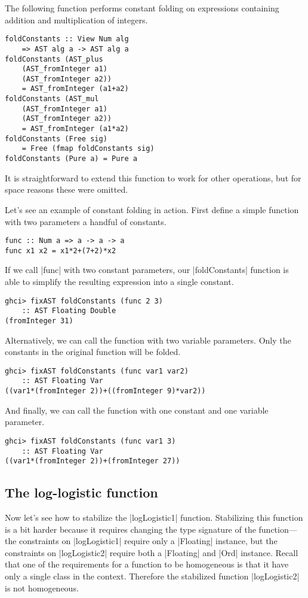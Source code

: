 \documentclass[preprint]{sigplanconf}
\theoremstyle{definition}
\begin{document}
The following function performs constant folding on expressions containing addition and multiplication of integers.
\begin{lstlisting}
foldConstants :: View Num alg
    => AST alg a -> AST alg a
foldConstants (AST_plus
    (AST_fromInteger a1)
    (AST_fromInteger a2))
    = AST_fromInteger (a1+a2)
foldConstants (AST_mul
    (AST_fromInteger a1)
    (AST_fromInteger a2))
    = AST_fromInteger (a1*a2)
foldConstants (Free sig)
    = Free (fmap foldConstants sig)
foldConstants (Pure a) = Pure a
\end{lstlisting}
It is straightforward to extend this function to work for other operations,
but for space reasons these were omitted.

Let's see an example of constant folding in action.
First define a simple function with two parameters a handful of constants.
\begin{lstlisting}
func :: Num a => a -> a -> a
func x1 x2 = x1*2+(7+2)*x2
\end{lstlisting}
If we call |func| with two constant parameters,
our |foldConstants| function is able to simplify the resulting expression into a single constant.
\begin{lstlisting}
ghci> fixAST foldConstants (func 2 3)
    :: AST Floating Double
(fromInteger 31)
\end{lstlisting}
Alternatively, we can call the function with two variable parameters.
Only the constants in the original function will be folded.
\begin{lstlisting}
ghci> fixAST foldConstants (func var1 var2)
    :: AST Floating Var
((var1*(fromInteger 2))+((fromInteger 9)*var2))
\end{lstlisting}
And finally, we can call the function with one constant and one variable parameter.
\begin{lstlisting}
ghci> fixAST foldConstants (func var1 3)
    :: AST Floating Var
((var1*(fromInteger 2))+(fromInteger 27))
\end{lstlisting}

\subsection{The log-logistic function}

Now let's see how to stabilize the |logLogistic1| function.
Stabilizing this function is a bit harder because it requires changing the type signature of the function---the constraints on |logLogistic1| require only a |Floating| instance, but the constraints on |logLogistic2| require both a |Floating| and |Ord| instance.
Recall that one of the requirements for a function to be homogeneous is that it have only a single class in the context.
Therefore the stabilized function |logLogistic2| is not homogeneous.
\end{document}
